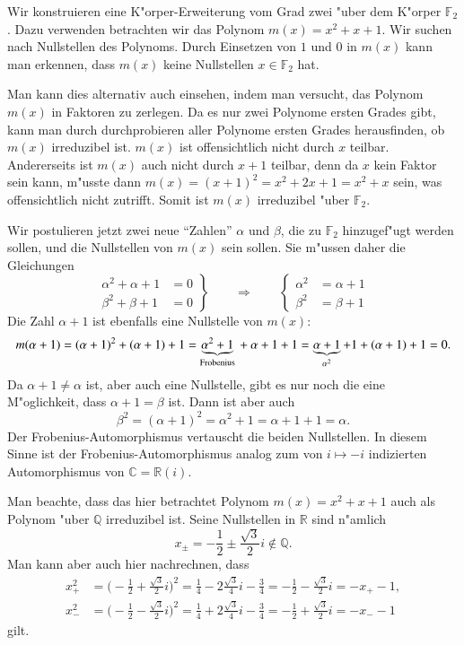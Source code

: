 \begin{beispiel}
Wir konstruieren eine K"orper-Erweiterung vom Grad zwei "uber dem K"orper
$\mathbb F_2$.
Dazu verwenden betrachten wir das Polynom $m(x)=x^2 + x + 1$.
Wir suchen nach Nullstellen des Polynoms.
Durch Einsetzen von $1$ und $0$ in $m(x)$ kann man erkennen, dass
$m(x)$ keine Nullstellen $x\in\mathbb F_2$ hat.

Man kann dies alternativ auch einsehen, indem man versucht, das Polynom
$m(x)$ in Faktoren zu zerlegen.
Da es nur zwei Polynome ersten Grades gibt, kann man durch durchprobieren
aller Polynome ersten Grades herausfinden, ob $m(x)$ irreduzibel ist.
$m(x)$ ist offensichtlich nicht durch $x$ teilbar.
Andererseits ist $m(x)$ auch nicht durch $x+1$ teilbar, denn da $x$ kein
Faktor sein kann, m"usste dann $m(x)=(x+1)^2=x^2 +  2x + 1=x^2+x$ sein,
was offensichtlich nicht zutrifft.
Somit ist $m(x)$ irreduzibel "uber $\mathbb F_2$.

Wir postulieren jetzt zwei neue ``Zahlen'' $\alpha$ und $\beta$, die
zu $\mathbb F_2$ hinzugef"ugt werden sollen, und die Nullstellen von 
$m(x)$ sein sollen.
Sie m"ussen daher die Gleichungen
\[
\left.
\begin{aligned}
\alpha^2 + \alpha +1&=0
\\
\beta^2 + \beta +1&=0
\end{aligned}
\right\}
\qquad\Rightarrow\qquad
\left\{
\begin{aligned}
\alpha^2&=\alpha+1\\
\beta^2&=\beta+1
\end{aligned}
\right.
\]
Die Zahl $\alpha+1$ ist ebenfalls eine Nullstelle von $m(x)$:
\[
m(\alpha+1)
=
(\alpha+1)^2+(\alpha+1) + 1
=
\underbrace{\alpha^2 + 1}_{\text{Frobenius}}\mathstrut + \alpha + 1 + 1
=
\underbrace{\alpha+1}_{\alpha^2} + 1+ (\alpha + 1) + 1=0.
\]
Da $\alpha+1\ne \alpha$ ist, aber auch eine Nullstelle, gibt es nur
noch die eine M"oglichkeit, dass $\alpha+1=\beta$ ist.
Dann ist aber auch
\[
\beta^2
=
(\alpha + 1)^2
= 
\alpha^2 + 1
=
\alpha + 1 + 1
=
\alpha.
\]
Der Frobenius-Automorphismus vertauscht die beiden Nullstellen.
In diesem Sinne ist der Frobenius-Automorphismus analog zum
von $i\mapsto -i$ indizierten Automorphismus von
$\mathbb C = \mathbb R(i)$.

Man beachte, dass das hier betrachtet Polynom $m(x)=x^2+x+1$ auch
als Polynom "uber $\mathbb Q$ irreduzibel ist.
Seine Nullstellen in $\mathbb R$ sind n"amlich
\[
x_{\pm}=-\frac12 \pm\frac{\sqrt{3}}{2}i\not\in\mathbb Q.
\]
Man kann aber auch hier nachrechnen, dass 
\begin{align*}
x_+^2
&=
\biggl(-\frac12+\frac{\sqrt{3}}{2}i\biggr)^2
=
\frac14-2\frac{\sqrt{3}}{4}i-\frac34
=
-\frac12-\frac{\sqrt{3}}{2}i
=
-x_+-1,
\\
x_-^2
&=
\biggl(-\frac12-\frac{\sqrt{3}}{2}i\biggr)^2
=
\frac14+2\frac{\sqrt{3}}{4}i-\frac34
=
-\frac12+\frac{\sqrt{3}}{2}i
=
-x_--1
\end{align*}
gilt.


\end{beispiel}
